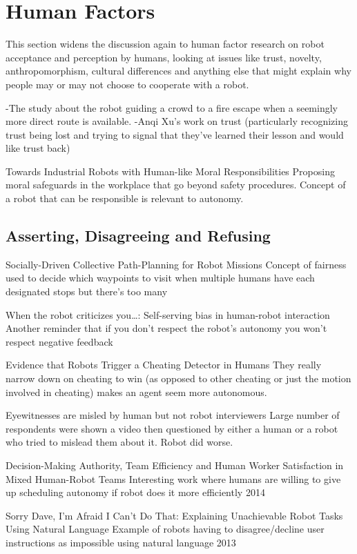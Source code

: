 \documentclass{sfuthesis}
\begin{document}
\section{Human Factors}

This section widens the discussion again to human factor research on robot acceptance and perception by humans, looking at issues like trust, novelty, anthropomorphism, cultural differences and anything else that might explain why people may or may not choose to cooperate with a robot.



-The study about the robot guiding a crowd to a fire escape when a seemingly more direct route is available.
-Anqi Xu's work on trust (particularly recognizing trust being lost and trying to signal that they've learned their lesson and would like trust back)

Towards Industrial Robots with Human-like Moral Responsibilities	Proposing moral safeguards in the workplace that go beyond safety procedures. Concept of a robot that can be responsible is relevant to autonomy.	

\subsection{Asserting, Disagreeing and Refusing}

Socially-Driven Collective Path-Planning for Robot Missions	Concept of fairness used to decide which waypoints to visit when multiple humans have each designated stops but there's too many

When the robot criticizes you…: Self-serving bias in human-robot interaction	Another reminder that if you don't respect the robot's autonomy you won't respect negative feedback	

Evidence that Robots Trigger a Cheating Detector in Humans	They really narrow down on cheating to win (as opposed to other cheating or just the motion involved in cheating) makes an agent seem more autonomous.	

Eyewitnesses are misled by human but not robot interviewers	Large number of respondents were shown a video then questioned by either a human or a robot who tried to mislead them about it. Robot did worse.	

Decision-Making Authority, Team Efficiency and Human Worker Satisfaction in Mixed Human-Robot Teams	Interesting work where humans are willing to give up scheduling autonomy if robot does it more efficiently	2014

Sorry Dave, I'm Afraid I Can't Do That: Explaining Unachievable Robot Tasks Using Natural Language	Example of robots having to disagree/decline user instructions as impossible using natural language	2013
\end{document}
